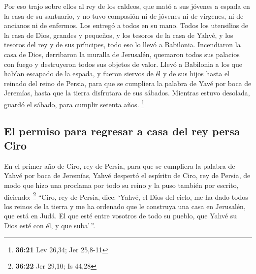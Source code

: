  Por eso trajo sobre ellos al rey de los caldeos, que
mató a sus jóvenes a espada en la casa de su santuario, y no tuvo
compasión ni de jóvenes ni de vírgenes, ni de ancianos ni de enfermos.
Los entregó a todos en su mano.  Todos los utensilios de
la casa de Dios, grandes y pequeños, y los tesoros de la casa de Yahvé,
y los tesoros del rey y de sus príncipes, todo eso lo llevó a Babilonia.
 Incendiaron la casa de Dios, derribaron la muralla de
Jerusalén, quemaron todos sus palacios con fuego y destruyeron todos sus
objetos de valor.  Llevó a Babilonia a los que habían
escapado de la espada, y fueron siervos de él y de sus hijos hasta el
reinado del reino de Persia,  para que se cumpliera la
palabra de Yavé por boca de Jeremías, hasta que la tierra disfrutara de
sus sábados. Mientras estuvo desolada, guardó el sábado, para cumplir
setenta años. \footnote{\textbf{36:21} Lev 26,34; Jer 25,8-11}

\hypertarget{el-permiso-para-regresar-a-casa-del-rey-persa-ciro}{%
\subsection{El permiso para regresar a casa del rey persa
Ciro}\label{el-permiso-para-regresar-a-casa-del-rey-persa-ciro}}

 En el primer año de Ciro, rey de Persia, para que se
cumpliera la palabra de Yahvé por boca de Jeremías, Yahvé despertó el
espíritu de Ciro, rey de Persia, de modo que hizo una proclama por todo
su reino y la puso también por escrito, diciendo: \footnote{\textbf{36:22}
  Jer 29,10; Is 44,28}  ``Ciro, rey de Persia, dice:
`Yahvé, el Dios del cielo, me ha dado todos los reinos de la tierra y me
ha ordenado que le construya una casa en Jerusalén, que está en Judá. El
que esté entre vosotros de todo su pueblo, que Yahvé su Dios esté con
él, y que suba'\,''.
